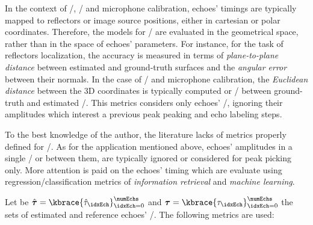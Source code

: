\mynewline
In the context of \RooGE/, \SSL/ and microphone calibration, echoes' timings are typically mapped to reflectors or image source positions, either in cartesian or polar coordinates.
Therefore, the models for \AER/ are evaluated in the geometrical space, rather than in the space of echoes' parameters.
For instance, for the task of reflectors localization, the accuracy is measured in terms of \textit{plane-to-plane distance} between estimated and ground-truth surfaces and the \textit{angular error} between their normals.
In the case of \SSL/ and microphone calibration, the \textit{Euclidean distance} between the 3D coordinates is typically computed or \RMSE/ between ground-truth and estimated \DOAs/.
This metrics considers only echoes' \TOA/, ignoring their amplitudes which interest a previous peak peaking and echo labeling steps.

\mynewline
To the best knowledge of the author, the literature lacks of metrics properly defined for \AER/.
As for the application mentioned above, echoes' amplitudes in a single \RIR/ or between them, are typically ignored or considered for peak picking only.
More attention is paid on the echoes' timing which are evaluate using regression/classification metrics of \textit{information retrieval} and \textit{machine learning}.

Let be $\hat{\boldsymbol{\tau}} = \kbrace{\hat{\tau}_\idxEch}_{\idxEch=0}^{\numEchs}$ and $\boldsymbol{\tau} = \kbrace{\tau_\idxEch}_{\idxEch=0}^{\numEchs}$ the sets of estimated and reference echoes' \TOAs/.
The following metrics are used:

